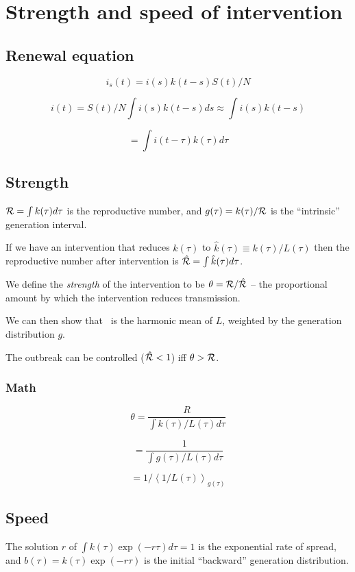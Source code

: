 \documentclass[12pt]{article}
\begin{document}
\section*{Strength and speed of intervention}

\subsection*{Renewal equation}

$$i_s(t) = i(s) k(t-s) S(t)/N$$

$$i(t) = S(t)/N \int{i(s) k(t-s)} ds \approx \int{i(s) k(t-s)}$$

$$ = \int i(t-\tau) k(\tau) d\tau $$

\subsection*{Strength}

${\cal R} = \int{k(\tau) d\tau}$ is the reproductive number, and 
$g(\tau) = k(\tau)/{\cal R}$ is the ``intrinsic'' generation interval.

If we have an intervention that reduces $k(\tau)$ to $\hat k(\tau) \equiv k(\tau)/L(\tau)$ then the reproductive number after intervention is $\hat {{\cal R}} = \int{\hat k(\tau) d\tau}$. 

We define the \emph{strength} of the intervention to be $\theta = {\cal R}/\hat {{\cal R}}$ -- the proportional amount by which the intervention reduces transmission.

We can then show that \strength\ is the harmonic mean of $L$, weighted by the generation distribution $g$.

The outbreak can be controlled ($\hat {{\cal R}}<1$) iff $\theta > {\cal R}$.

\subsubsection*{Math}

$$\theta = \frac{R}{\int{k(\tau)/L(\tau)d\tau}}$$

$$ = \frac{1}{\int{g(\tau)/L(\tau)d\tau}}$$

$$ = 1/\left\langle 1/L(\tau) \right\rangle_{g(\tau)}$$

\subsection*{Speed}

The solution $r$ of $\int{k(\tau) \exp(-r\tau) d\tau} = 1$ is the 
exponential rate of spread, and $b(\tau) = k(\tau) \exp(-r\tau)$ is the initial ``backward'' generation distribution.
\end{document}
